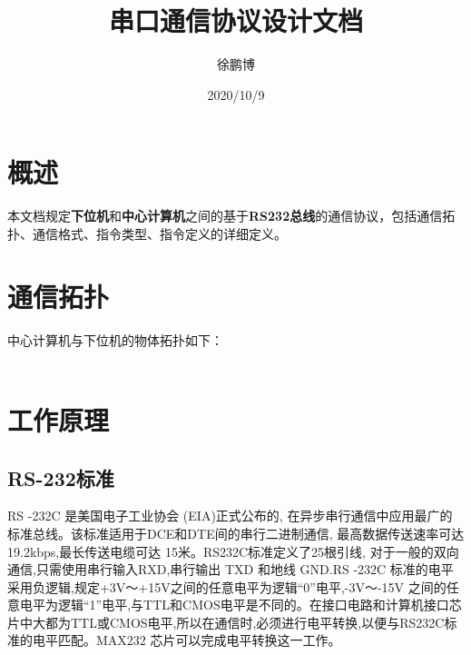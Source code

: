 \documentclass{article}
\begin{document}
\begin{titlepage}
\title{串口通信协议设计文档}
\author{徐鹏博}
\date{2020/10/9}
\end{titlepage}

\maketitle
\tableofcontents{}
\newpage{}
\section{概述}
\noindent 本文档规定\textbf{下位机}和\textbf{中心计算机}之间的基于\textbf{RS232总线}的通信协议，包括通信拓扑、通信格式、指令类型、指令定义的详细定义。
\section{通信拓扑}
\noindent 中心计算机与下位机的物体拓扑如下：\\ \\


\section{工作原理}
\subsection{RS-232标准}
\noindent RS -232C 是美国电子工业协会 (EIA)正式公布的, 在异步串行通信中应用最广的标准总线。该标准适用于DCE和DTE间的串行二进制通信, 最高数据传送速率可达19.2kbps,最长传送电缆可达 15米。RS232C标准定义了25根引线, 对于一般的双向通信,只需使用串行输入RXD,串行输出 TXD 和地线 GND.RS -232C 标准的电平采用负逻辑,规定+3V～+15V之间的任意电平为逻辑“0”电平,-3V～-15V 之间的任意电平为逻辑“1”电平,与TTL和CMOS电平是不同的。在接口电路和计算机接口芯片中大都为TTL或CMOS电平,所以在通信时,必须进行电平转换,以便与RS232C标准的电平匹配。MAX232 芯片可以完成电平转换这一工作。\\
\end{document}
